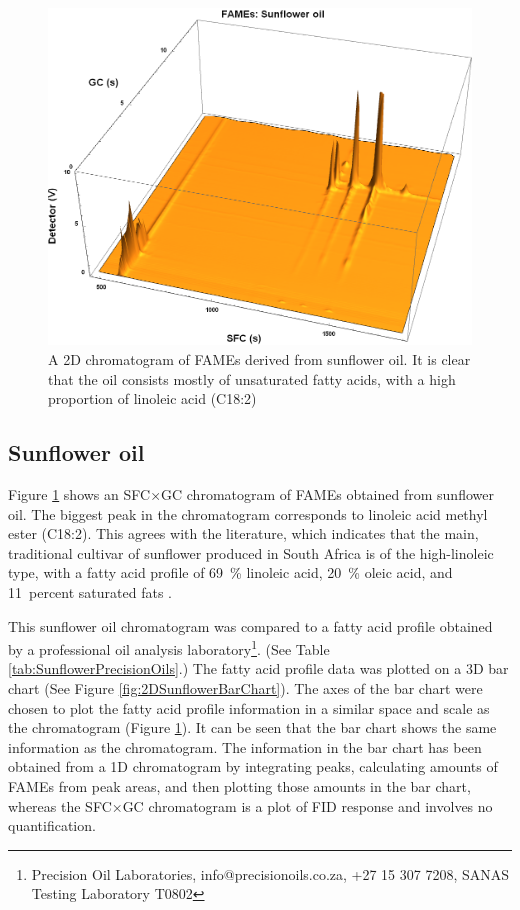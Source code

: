 \begin{figure}
\centering
\includegraphics[width=\textwidth]{Figures/Sunflower.png}
\decoRule

\caption[SFC×GC of sunflower oil]{A 2D chromatogram of FAMEs derived from
sunflower oil. It is clear that the oil consists mostly of unsaturated fatty
acids, with a high proportion of linoleic acid (C18:2)}

\label{fig:2DSunflower}
\end{figure}

\subsection{Sunflower oil}

Figure \ref{fig:2DSunflower} shows an SFC×GC chromatogram of FAMEs obtained from
sunflower oil. The biggest peak in the chromatogram corresponds to linoleic acid
methyl ester (C18:2). This agrees with the literature, which indicates that the
main, traditional cultivar of sunflower produced in South Africa is of the
high-linoleic type, with a fatty acid profile of \SI{69}{\percent} linoleic
acid, \SI{20}{\percent} oleic acid, and \SI{11}{percent} saturated fats
\autocite {JFAOWHOCAC2019}.

This sunflower oil chromatogram was compared to a fatty acid profile obtained by
a professional oil analysis laboratory\footnote{Precision Oil Laboratories,
info@precisionoils.co.za,  +27 15 307 7208, SANAS Testing Laboratory T0802}.
(See Table \ref{tab:SunflowerPrecisionOils}.) The fatty acid profile data was
plotted on a 3D bar chart (See Figure \ref{fig:2DSunflowerBarChart}). The axes
of the bar chart were chosen to plot the fatty acid profile information in a
similar space and scale as the chromatogram (Figure \ref{fig:2DSunflower}). It
can be seen that the bar chart shows the same information as the chromatogram.
The information in the bar chart has been obtained from a 1D chromatogram by
integrating peaks, calculating amounts of FAMEs from peak areas, and then
plotting those amounts in the bar chart, whereas the SFC×GC chromatogram is a
plot of FID response and involves no quantification.

